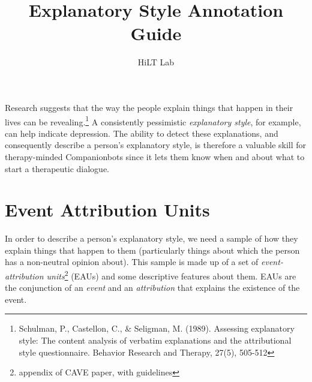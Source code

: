 \documentclass[a4paper,12pt]{article}
\begin{document}
\title{Explanatory Style Annotation Guide}
\author{HiLT Lab}
\maketitle


Research suggests that the way the people explain things that happen in their lives can be revealing.\footnote{\label{seligman89}Schulman, P., Castellon, C., \& Seligman, M. (1989). Assessing explanatory style: The content analysis of verbatim explanations and the attributional style questionnaire. Behavior Research and Therapy, 27(5), 505-512} %
A consistently pessimistic \emph{explanatory style}, for example, can help indicate depression.
The ability to detect these explanations, and consequently describe a person's explanatory style, is therefore a valuable skill for therapy-minded Companionbots since it lets them know when and about what to start a therapeutic dialogue.

\section{Event Attribution Units}
In order to describe a person's explanatory style, we need a sample of how they explain things that happen to them (particularly things about which the person has a non-neutral opinion about). %
This sample is made up of a set of \emph{event-attribution units}\footnote{\label{CAVE}appendix of CAVE paper, with guidelines} (EAUs) and some descriptive features about them.
EAUs are the conjunction of an \emph{event} and an \emph{attribution} that explains the existence of the event.
 
\end{document}
